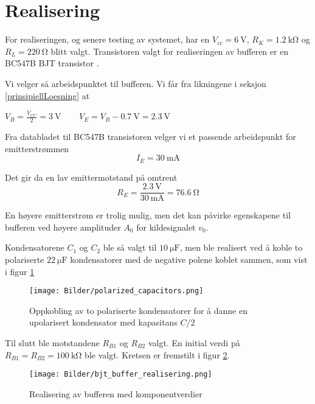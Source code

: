 \section{Realisering}
\label{realisering}

For realiseringen, og senere testing av systemet, har en $V_{cc} = \SI{6}{\volt}$, 
$R_K = \SI{1.2}{\kilo\ohm}$ og $R_L = \SI{220}{\ohm}$ blitt valgt. 
Transistoren valgt for realiseringen av bufferen er en BC547B BJT transistor \cite{bjt}.

Vi velger så arbeidspunktet til bufferen.
Vi får fra likningene i seksjon \ref{prinsipiellLoesning} at 
\begin{center}
    $V_B = \frac{V_{CC}}{2} = \SI{3}{\volt}\:\:\:\:$ $\:\:\:\:V_E = V_B - \SI{0.7}{\volt} = \SI{2.3}{\volt}$
\end{center}

Fra databladet til BC547B transistoren velger vi et passende arbeidspunkt for emitterstrømmen
\[
    I_E = \SI{30}{\milli\ampere}
\]

Det gir da en lav emittermotstand på omtrent 
\[
    R_E = \frac{\SI{2.3}{\volt}}{\SI{30}{\milli\ampere}} = \SI{76.6}{\ohm}
\]

En høyere emitterstrøm er trolig mulig, men det kan påvirke egenskapene til bufferen ved høyere 
amplituder $A_0$ for kildesignalet $v_0$.

Kondensatorene $C_1$ og $C_2$ ble så valgt til $\SI{10}{\micro\farad}$, men ble realisert ved å koble to
polariserte $\SI{22}{\micro\farad}$ kondensatorer med de negative polene koblet sammen, som vist i figur 
\ref{fig:polarized_capacitor}

\begin{figure}[H]
    \centering
    \texttt{[image: Bilder/polarized\_capacitors.png]}
    \caption{Oppkobling av to polariserte kondensatorer for å danne en upolarisert kondensator med kapasitans $C/2$}
    \label{fig:polarized_capacitor}
\end{figure}

Til slutt ble motstandene $R_{B1}$ og $R_{B2}$ valgt. En initial verdi på $R_{B1} = R_{B2} = \SI{100}{\kilo\ohm}$ 
ble valgt. Kretsen er fremstilt i figur \ref{fig:buffer_realisering}.

\begin{figure}[H]
    \centering
    \texttt{[image: Bilder/bjt\_buffer\_realisering.png]}
    \caption{Realisering av bufferen med komponentverdier}
    \label{fig:buffer_realisering}
\end{figure}


